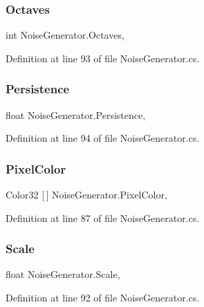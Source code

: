 \subsubsection{Octaves}
{\footnotesize\ttfamily int Noise\+Generator.\+Octaves\hspace{0.3cm}{\ttfamily [get]}, {\ttfamily [set]}}



Definition at line 93 of file Noise\+Generator.\+cs.

\mbox{\label{class_noise_generator_ac38e86ad2ac5823099dcbcca7e3c2818}} 
\subsubsection{Persistence}
{\footnotesize\ttfamily float Noise\+Generator.\+Persistence\hspace{0.3cm}{\ttfamily [get]}, {\ttfamily [set]}}



Definition at line 94 of file Noise\+Generator.\+cs.

\mbox{\label{class_noise_generator_acdb9a256d433b7482dc9fbd66c79bda3}} 
\subsubsection{Pixel\+Color}
{\footnotesize\ttfamily Color32 [$\,$] Noise\+Generator.\+Pixel\+Color\hspace{0.3cm}{\ttfamily [get]}, {\ttfamily [set]}}



Definition at line 87 of file Noise\+Generator.\+cs.

\mbox{\label{class_noise_generator_a50fad63e094e22ec773e9be4ca7ce777}} 
\subsubsection{Scale}
{\footnotesize\ttfamily float Noise\+Generator.\+Scale\hspace{0.3cm}{\ttfamily [get]}, {\ttfamily [set]}}



Definition at line 92 of file Noise\+Generator.\+cs.

